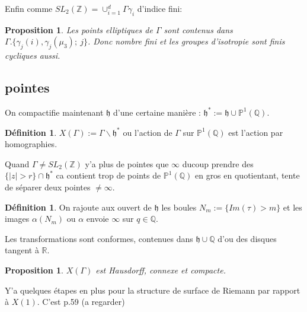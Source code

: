 \documentclass[12pt]{article}
\theoremstyle{plain}
\newtheorem{prop}[subsubsection]{Proposition}
\theoremstyle{definition}
\newtheorem{defn}[subsubsection]{D\'efinition}
\theoremstyle{remark}
\newcommand{\Z}{\mathbb{Z}}
\newcommand{\Q}{\mathbb{Q}}
\newcommand{\Proj}{\mathbb{P}}
\newcommand{\h}{\mathfrak{h}}
\begin{document}
Enfin comme $SL_2(\Z)=\cup_{i=1}^{d}\Gamma\gamma_i$ d'indice fini:
\begin{prop}
    Les points elliptiques de $\Gamma$ sont contenus dans $\Gamma.\{\gamma_j(i),\gamma_j(\mu_3);~j\}$. Donc nombre fini
    et les groupes d'isotropie sont finis cycliques aussi.
\end{prop}

\subsection{pointes}
On compactifie maintenant $\h$ d'une certaine manière : $\h^*:=\h\cup\Proj^1(\Q)$. 
\begin{defn}
    $X(\Gamma):=\Gamma\backslash \h^*$ ou l'action de $\Gamma$ sur $\Proj^1(\Q)$ est l'action par homographies.
\end{defn}

Quand $\Gamma\ne SL_2(\Z)$ y'a plus de pointes que $\infty$ ducoup prendre des $\{\lvert z\rvert > r\}\cap \h^*$ 
ca contient trop de points de $\Proj^1(\Q)$ en gros en quotientant, tente de séparer deux pointes $\ne\infty$.

\begin{defn}
    On rajoute aux ouvert de $\h$ les boules $N_m:=\{Im(\tau)> m\}$ et les images $\alpha(N_m)$ ou 
    $\alpha$ envoie $\infty$ sur $q\in\Q$.
\end{defn}
Les transformations sont conformes, contenues dans $\h\cup\Q$ d'ou des disques tangent à $\mathbb{R}$.


\begin{prop}
    $X(\Gamma)$ est Hausdorff, connexe et compacte.
\end{prop}

Y'a quelques étapes en plus pour la structure de surface de Riemann par rapport à $X(1)$. C'est p.59 (a regarder)
\end{document}
